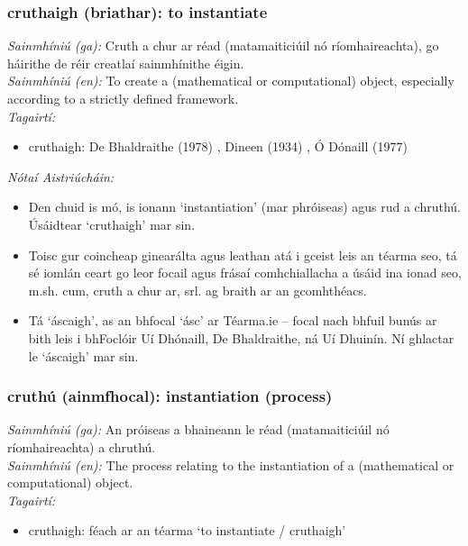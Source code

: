 \documentclass{article}
\begin{document}
\subsubsection*{cruthaigh (briathar): to instantiate}
 \noindent \textit{Sainmhíniú (ga):} Cruth a chur ar réad (matamaiticiúil nó ríomhaireachta), go háirithe de réir creatlaí sainmhínithe éigin.
\\
 \noindent \textit{Sainmhíniú (en):} To create a (mathematical or computational) object, especially according to a strictly defined framework.
\\
 \noindent \textit{Tagairtí:}
\begin{itemize}
	\item cruthaigh: De Bhaldraithe (1978) \cite{de-bhaldraithe}, Dineen (1934) \cite{dineen}, Ó Dónaill (1977) \cite{odonaill}
\end{itemize}

 \noindent \textit{Nótaí Aistriúcháin:}
\begin{itemize}
	\item Den chuid is mó, is ionann `instantiation' (mar phróiseas) agus rud a chruthú. Úsáidtear `cruthaigh' mar sin.
	\item Toisc gur coincheap ginearálta agus leathan atá i gceist leis an téarma seo, tá sé iomlán ceart go leor focail agus frásaí comhchiallacha a úsáid ina ionad seo, m.sh. cum, cruth a chur ar, srl. ag braith ar an gcomhthéacs.
	\item Tá `áscaigh', as an  bhfocal `ásc' ar Téarma.ie -- focal nach bhfuil bunús ar bith leis i bhFoclóir Uí Dhónaill, De Bhaldraithe, ná Uí Dhuinín. Ní ghlactar le `áscaigh' mar sin.
\end{itemize}


\subsubsection*{cruthú (ainmfhocal): instantiation (process)}
 \noindent \textit{Sainmhíniú (ga):} An próiseas a bhaineann le réad (matamaiticiúil nó ríomhaireachta) a chruthú.
\\
 \noindent \textit{Sainmhíniú (en):} The process relating to the instantiation of a (mathematical or computational) object.
\\
 \noindent \textit{Tagairtí:}
\begin{itemize}
	\item cruthaigh: féach ar an téarma `to instantiate / cruthaigh'
\end{itemize}
\end{document}
